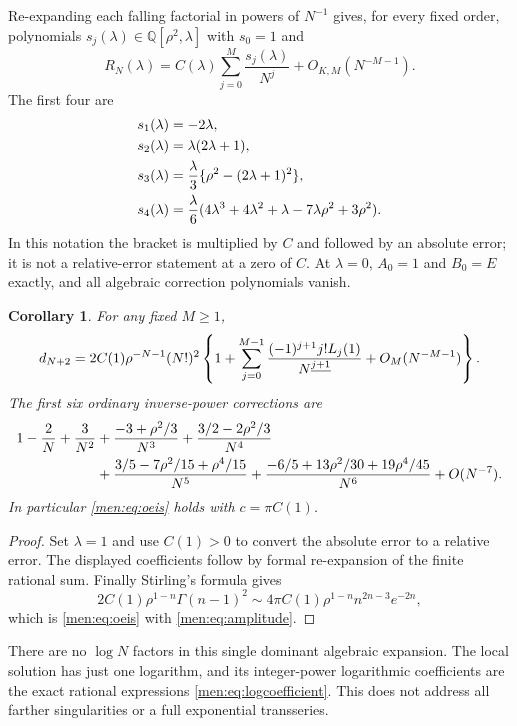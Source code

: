 \documentclass[11pt,letterpaper]{article}
\newtheorem{corollary}[theorem]{Corollary}
\theoremstyle{remark}\newtheorem{remark}[theorem]{Remark}
\begin{document}
Re-expanding each falling factorial in powers of $N^{-1}$ gives, for every fixed order, polynomials $s_j(\lambda)\in\mathbb Q[\rho^2,\lambda]$ with $s_0=1$ and
\[
 R_N(\lambda)=C(\lambda)\sum_{j=0}^M\frac{s_j(\lambda)}{N^j}
                    +O_{K,M}(N^{-M-1}).
\]
The first four are
\begin{align}
 s_1(\lambda)&=-2\lambda,\notag\\
 s_2(\lambda)&=\lambda(2\lambda+1),\notag\\
 s_3(\lambda)&=\frac\lambda3\{\rho^2-(2\lambda+1)^2\},\label{men:eq:sfirst}\\
 s_4(\lambda)&=\frac\lambda6
 (4\lambda^3+4\lambda^2+\lambda-7\lambda\rho^2+3\rho^2).\notag
\end{align}
In this notation the bracket is multiplied by $C$ and followed by an absolute error; it is not a relative-error statement at a zero of $C$. At $\lambda=0$, $A_0=1$ and $B_0=E$ exactly, and all algebraic correction polynomials vanish.

\begin{corollary}\label{men:cor:scalar}
For any fixed $M\ge1$,
\begin{equation}\label{men:eq:scalarall}
 d_{N+2}=2C(1)\rho^{-N-1}(N!)^2
 \left\{1+\sum_{j=0}^{M-1}\frac{(-1)^{j+1}j!L_j(1)}{N^{\underline{j+1}}}
                +O_M(N^{-M-1})\right\}.
\end{equation}
The first six ordinary inverse-power corrections are
\begin{align}\label{men:eq:scalar6}
 1-\frac2N+\frac3{N^2}
 &+\frac{-3+\rho^2/3}{N^3}
 +\frac{3/2-2\rho^2/3}{N^4}\notag\\
 &+\frac{3/5-7\rho^2/15+\rho^4/15}{N^5}
 +\frac{-6/5+13\rho^2/30+19\rho^4/45}{N^6}+O(N^{-7}).
\end{align}
In particular \eqref{men:eq:oeis} holds with $c=\pi C(1)$.
\end{corollary}
\begin{proof}
Set $\lambda=1$ and use $C(1)>0$ to convert the absolute error to a relative error. The displayed coefficients follow by formal re-expansion of the finite rational sum. Finally Stirling's formula gives
\[
 2C(1)\rho^{1-n}\Gamma(n-1)^2
 \sim 4\pi C(1)\rho^{1-n}n^{2n-3}e^{-2n},
\]
which is \eqref{men:eq:oeis} with \eqref{men:eq:amplitude}.
\end{proof}

There are no $\log N$ factors in this single dominant algebraic expansion. The local solution has just one logarithm, and its integer-power logarithmic coefficients are the exact rational expressions \eqref{men:eq:logcoefficient}. This does not address all farther singularities or a full exponential transseries.
\end{document}
